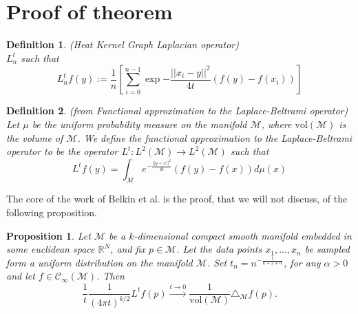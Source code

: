 \documentclass{article} %
\newtheorem{definition}{Definition}[section]
\newtheorem{prop}{Proposition}
\begin{document}



\newpage
{\LARGE {}}
\appendix

\section{Proof of theorem}

\begin{definition}{}(Heat Kernel Graph Laplacian operator)\\
	\label{def:Heat Kernel Graph Laplacian operator}
	$L_n^t$ such that
	$$L_n^tf(y) := \frac{1}{n}\left[ \sum_{i=0}^{n-1} \exp{-\frac{||x_i-y||^2}{4t}}\left(f(y)-f(x_i)\right)\right]$$
\end{definition}
\begin{definition}{}(from \cite[Belkin et al. ]{Belkin:2005:TTF:2138147.2138189}Functional approximation to the Laplace-Beltrami operator)\\ \label{eq: my L^t} Let $\mu$ be the uniform probability measure on the manifold $\mathcal M$, where $\text{vol}(\mathcal M)$ is the volume of $\mathcal M$. We define the functional approximation to the Laplace-Beltrami operator to be the operator $L^t: L^{2}(\mathcal{M}) \rightarrow L^{2}(\mathcal{M})$ such that
	\label{def:Functional approximation to the Laplace-Beltrami operator}
	$$ L^tf(y) = \int_{\mathcal M}e^{-\frac{||y-x||^2}{4t}}\left(f(y)-f(x)\right)d\mu(x)$$
\end{definition}

The core of the work of Belkin et al. is the proof, that we will not discuss, of the following proposition.

\begin{prop} 	Let $\mathcal M$ be a $k$-dimensional compact smooth manifold embedded in some euclidean space $\mathbb R^N$, and fix $p\in\mathcal M$. Let the data points $x_1, \dots, x_n$ be sampled form a uniform distribution on the manifold $\mathcal M$. Set $t_n=n^{-\frac{1}{k+2+\alpha}}$, for any $\alpha>0$ and let $f\in\mathcal C_\infty(\mathcal M)$. Then
	$$\frac{1}{t}\frac{1}{(4\pi t)^{k/2}} L^tf(p) \xrightarrow{t\to 0 } \frac{1}{\text{vol}(\mathcal M)}\triangle_{\mathcal M}f(p).$$
	\label{prop:3}
\end{prop}
\end{document}
